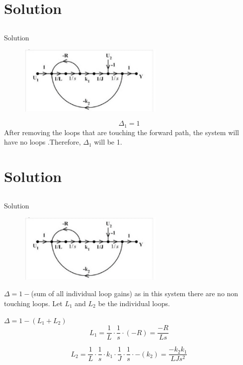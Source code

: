 \documentclass[10pt]{beamer}
\begin{document}
\section{Solution}
\subsection{}
\begin{frame}{Solution}
\begin{figure}
    \centering
    \includegraphics[width=7cm]{image.jpg}

\end{figure}

\[ \Delta_1 =1
\]
After removing the loops that are touching the forward path, the system will have no loops .Therefore, $\Delta_1$ will be 1.


\end{frame}

\section{Solution}
\subsection{}
\begin{frame}{Solution}
\begin{figure}
    \centering
    \includegraphics[width=7cm]{image.jpg}

\end{figure}

$\Delta= 1 - $(sum of all individual loop gains)
as in this system there are no non touching loops.
Let $L_1$ and $L_2$ be the individual loops.

\centering
$\Delta= 1 - (L_1+L_2)$
\[

L_1= \dfrac{1}{L}\cdot \dfrac {1}{s}\cdot(-R)=\dfrac{-R}{Ls}
\]

\[
L_2=\dfrac{1}{L}\cdot \dfrac{1}{s}\cdot k_1 \cdot \dfrac{1}{J} \cdot \dfrac{1}{s}\cdot -(k_2) =\dfrac{-k_2 k_1}{LJs^2}
\]

\end{frame}
\end{document}
